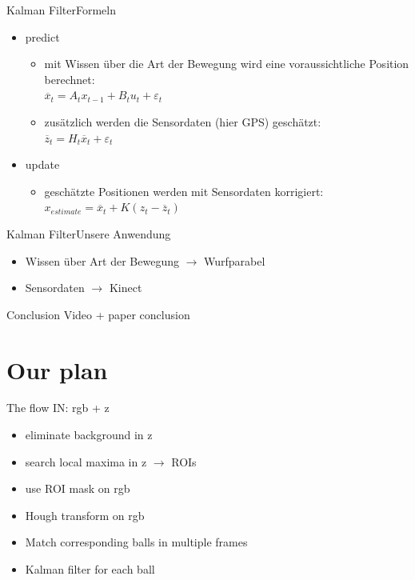 \documentclass{beamer}
\begin{document}
\begin{frame}{Kalman Filter}{Formeln}
\begin{itemize}
\item<1-> predict
\begin{itemize}
\item<2-> mit Wissen über die Art der Bewegung wird eine voraussichtliche Position berechnet:\\\qquad\qquad$\overline{x}_{t} = A_{t}x_{t-1} + B_{t}u_{t} + \varepsilon_{t}$
\item<2-> zusätzlich werden die Sensordaten (hier GPS) geschätzt:\\\qquad\qquad$\overline{z}_{t} = H_{t}\overline{x}_{t} + \varepsilon_{t}$
\end{itemize}
\item<1-> update
\begin{itemize}
\item<3-> geschätzte Positionen werden mit Sensordaten korrigiert:\\\qquad\qquad$x_{estimate} = \overline{x}_{t} + K(z_{t} - \overline{z}_{t})$
\end{itemize}
\end{itemize}
\end{frame}

\begin{frame}{Kalman Filter}{Unsere Anwendung}
\begin{itemize}
\item Wissen über Art der Bewegung $\rightarrow$ Wurfparabel
\item Sensordaten $\rightarrow$ Kinect
\end{itemize}
\end{frame}

\begin{frame}{Conclusion}
   Video + paper conclusion
\end{frame}

\section{Our plan}
\begin{frame}{The flow}
IN: rgb + z

\begin{itemize}
	\item eliminate background in z
	\item search local maxima in z $\rightarrow$ ROIs
	\item use ROI mask on rgb
	\item Hough transform on rgb
	\item Match corresponding balls in multiple frames
	\item Kalman filter for each ball
\end{itemize}
\end{frame}
\end{document}

